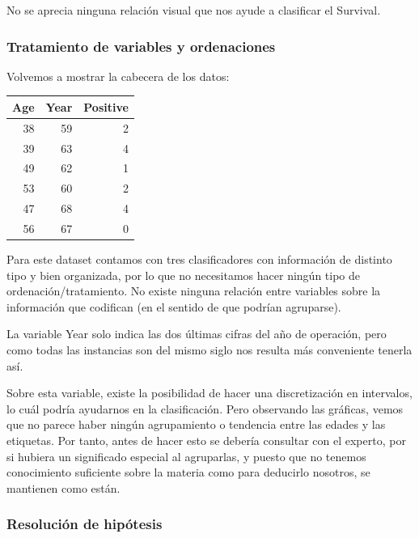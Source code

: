 No se aprecia ninguna relación visual que nos ayude a clasificar el Survival.

\newpage

\subsubsection{Tratamiento de variables y ordenaciones}

Volvemos a mostrar la cabecera de los datos:

\vspace{\baselineskip}

\begin{tabular}{r|r|r}
\hline
Age & Year & Positive\\
\hline
38 & 59 & 2\\
\hline
39 & 63 & 4\\
\hline
49 & 62 & 1\\
\hline
53 & 60 & 2\\
\hline
47 & 68 & 4\\
\hline
56 & 67 & 0\\
\hline
\end{tabular}

\vspace{\baselineskip}

Para este dataset contamos con tres clasificadores con información de distinto tipo y bien organizada, por lo que no necesitamos hacer ningún tipo de ordenación/tratamiento. No existe ninguna relación entre variables sobre la información que codifican (en el sentido de que
podrían agruparse).

La variable Year solo indica las dos últimas cifras del año de operación, pero como todas las instancias son del mismo siglo nos resulta más conveniente tenerla así.

\vspace{\baselineskip}

Sobre esta variable, existe la posibilidad de hacer una discretización en intervalos, lo cuál podría ayudarnos en la clasificación. Pero observando las gráficas, vemos que no parece haber ningún agrupamiento o tendencia entre las edades y las etiquetas.
Por tanto, antes de hacer esto se debería consultar con el experto, por si hubiera un significado especial al agruparlas, y puesto que no tenemos conocimiento suficiente sobre la materia como para deducirlo nosotros, se mantienen como están.

\subsubsection{Resolución de hipótesis}

